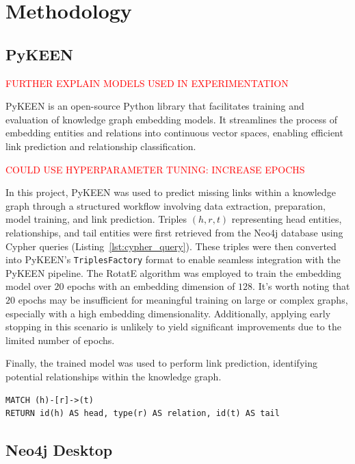 \section*{Methodology}

\subsection*{PyKEEN}

\textcolor{red}{FURTHER EXPLAIN MODELS USED IN EXPERIMENTATION}

PyKEEN \cite{pykeen} is an open-source Python library that facilitates training and evaluation of knowledge graph embedding models. It streamlines the process of embedding entities and relations into continuous vector spaces, enabling efficient link prediction and relationship classification.

\textcolor{red}{COULD USE HYPERPARAMETER TUNING: INCREASE EPOCHS}

In this project, PyKEEN was used to predict missing links within a knowledge graph through a structured workflow involving data extraction, preparation, model training, and link prediction. Triples $(h, r, t)$ representing head entities, relationships, and tail entities were first retrieved from the Neo4j database using Cypher queries (Listing~\ref{lst:cypher_query}). These triples were then converted into PyKEEN's \texttt{TriplesFactory} format to enable seamless integration with the PyKEEN pipeline. The RotatE algorithm was employed to train the embedding model over $20$ epochs with an embedding dimension of $128$. It's worth noting that $20$ epochs may be insufficient for meaningful training on large or complex graphs, especially with a high embedding dimensionality. Additionally, applying early stopping in this scenario is unlikely to yield significant improvements due to the limited number of epochs.

Finally, the trained model was used to perform link prediction, identifying potential relationships within the knowledge graph.

\begin{lstlisting}[caption=Cypher query to retrieve triples., label=lst:cypher_query]
MATCH (h)-[r]->(t)
RETURN id(h) AS head, type(r) AS relation, id(t) AS tail
\end{lstlisting}

\subsection*{Neo4j Desktop}

